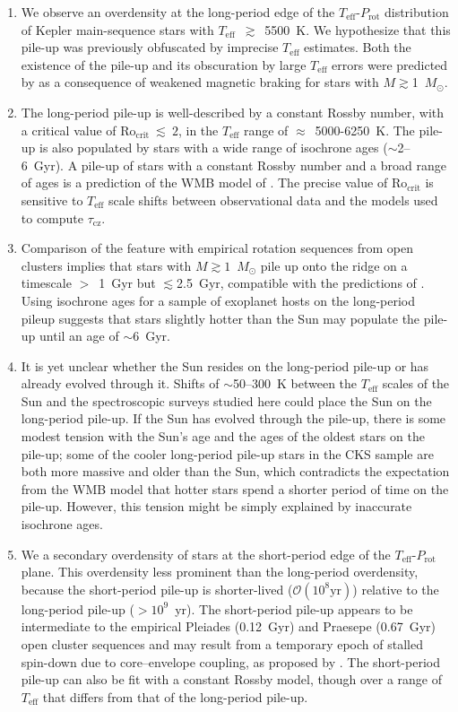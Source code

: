 \documentclass[trackchanges,twocolumn]{aastex631}
\newcommand{\taucz}{$\tau_\mathrm{cz}$\xspace}
\newcommand{\rocrit}{$\mathrm{Ro_{crit}}$\xspace}
\newcommand{\rocritfinal}{$\mathrm{Ro_{crit}}~\lesssim~2$\xspace}
\newcommand{\teffmin}{5500~K\xspace}
\newcommand{\agerange}{$\sim$2--6~Gyr\xspace}
\newcommand{\teff}{\ensuremath{T_{\mathrm{eff}}}\xspace}
\newcommand{\msun}{$M_\odot$\xspace}
\newcommand{\prot}{\ensuremath{P_\mathrm{rot}}\xspace}
\begin{document}
\begin{enumerate}
    \item We observe an overdensity at the long-period edge of the \teff-\prot distribution of Kepler main-sequence stars with \teff~$\gtrsim$~\teffmin. We hypothesize that this pile-up was previously obfuscated by imprecise \teff estimates. Both the existence of the pile-up and its obscuration by large \teff errors were predicted by \citet{vanSaders2019} as a consequence of weakened magnetic braking for stars with $M\gtrsim$1~\msun. 
    
    \item The long-period pile-up is well-described by a constant Rossby number, with a critical value of \rocritfinal, in the \teff range of $\approx$~5000-6250~K. The pile-up is also populated by stars with a wide range of isochrone ages (\agerange). A pile-up of stars with a constant Rossby number and a broad range of ages is a prediction of the WMB model of \citet{vanSaders2016, vanSaders2019}. The precise value of \rocrit is sensitive to \teff scale shifts between observational data and the models used to compute \taucz. 

    \item Comparison of the feature with empirical rotation sequences from open clusters implies that stars with $M\gtrsim1$~\msun pile up onto the ridge on a timescale $>$~1~Gyr but $\lesssim$2.5~Gyr, compatible with the predictions of \citet{vanSaders2019}. Using isochrone ages for a sample of exoplanet hosts on the long-period pileup suggests that stars slightly hotter than the Sun may populate the pile-up until an age of $\sim$6~Gyr.
    
    \item It is yet unclear whether the Sun resides on the long-period pile-up or has already evolved through it. Shifts of $\sim$50--300~K between the \teff scales of the Sun and the spectroscopic surveys studied here could place the Sun on the long-period pile-up. If the Sun has evolved through the pile-up, there is some modest tension with the Sun's age and the ages of the oldest stars on the pile-up; some of the cooler long-period pile-up stars in the CKS sample are both more massive and older than the Sun, which contradicts the expectation from the WMB model that hotter stars spend a shorter period of time on the pile-up. However, this tension might be simply explained by inaccurate isochrone ages.
    
    \item We  a secondary overdensity of stars at the short-period edge of the \teff-\prot plane. This overdensity  less prominent than the long-period overdensity,  because the short-period pile-up is shorter-lived ($\mathcal{O}(10^8 \text{yr})$) relative to the long-period pile-up ($>10^9$~yr). The short-period pile-up appears to be intermediate to the empirical Pleiades (0.12~Gyr) and Praesepe (0.67~Gyr) open cluster sequences and may result from a temporary epoch of stalled spin-down due to core–envelope coupling, as proposed by \citet{Curtis2020}. The short-period pile-up can also be fit with a constant Rossby model, though over a range of \teff that differs from that of the long-period pile-up.
    

\end{enumerate}
\end{document}
